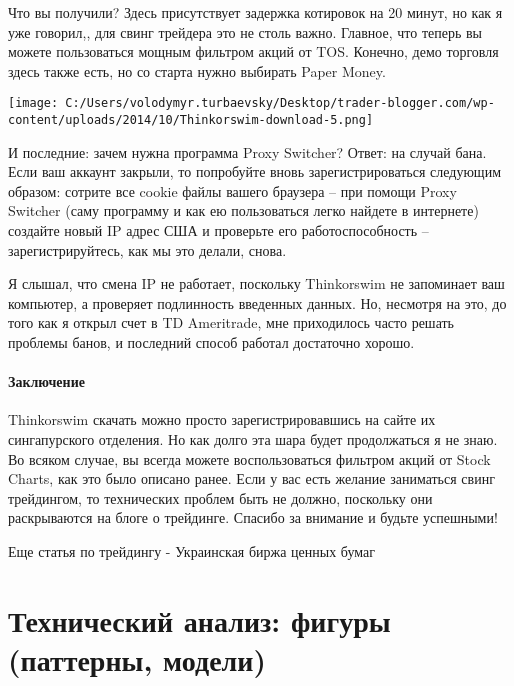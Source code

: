 \documentclass[a5paper]{article}
\begin{document}
Что вы получили? Здесь присутствует задержка котировок на 20 минут, но
как я уже говорил,, для свинг трейдера это не столь важно. Главное,
что теперь вы можете пользоваться мощным фильтром акций от
TOS. Конечно, демо торговля здесь также есть, но со старта нужно
выбирать Paper Money.

\texttt{[image: C:/Users/volodymyr.turbaevsky/Desktop/trader-blogger.com/wp-content/uploads/2014/10/Thinkorswim-download-5.png]}

И последние: зачем нужна программа Proxy Switcher? Ответ: на случай бана. Если ваш аккаунт закрыли, то попробуйте вновь зарегистрироваться следующим образом: сотрите все cookie файлы вашего браузера – при помощи Proxy Switcher (саму программу и как ею пользоваться легко найдете в интернете) создайте новый IP адрес США и проверьте его работоспособность – зарегистрируйтесь, как мы это делали, снова.

Я слышал, что смена IP не работает, поскольку Thinkorswim не
запоминает ваш компьютер, а проверяет подлинность введенных
данных. Но, несмотря на это, до того как я открыл счет в TD
Ameritrade, мне приходилось часто решать проблемы банов, и последний
способ работал достаточно хорошо.

\paragraph{Заключение}

Thinkorswim скачать можно просто зарегистрировавшись на сайте их сингапурского отделения. Но как долго эта шара будет продолжаться я не знаю. Во всяком случае, вы всегда можете воспользоваться фильтром акций от Stock Charts, как это было описано ранее. Если у вас есть желание заниматься свинг трейдингом, то технических проблем быть не должно, поскольку они раскрываются на блоге о трейдинге. Спасибо за внимание и будьте успешными!


Еще статья по трейдингу - Украинская биржа ценных бумаг


\section{Технический анализ: фигуры (паттерны, модели)}
\end{document}
